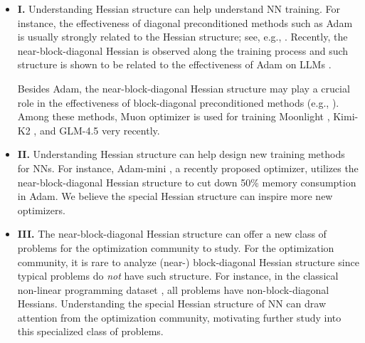 \documentclass{article}
\newcommand{\1}{^{(1)}}
\newcommand{\2}{^{(2)}}
\begin{document}
\begin{itemize}
[topsep=1pt,parsep=1pt,partopsep=1pt, leftmargin=*]
    \item {\bf I.} Understanding Hessian structure can help understand NN training. For instance, the effectiveness of diagonal preconditioned methods such as Adam \citep{kingma2014adam} is usually strongly related to the Hessian structure; see, e.g.,  \citet{sun2021worst,qu2022optimal,das2024towards}. Recently, the near-block-diagonal Hessian is observed along the training process and such structure is shown to 
 be related to the effectiveness of Adam on LLMs \citep{zhang2024transformers,kunstner2024heavy}. 
 
 Besides Adam, the near-block-diagonal Hessian structure may play a crucial role in the effectiveness of block-diagonal preconditioned methods (e.g.,  \citep{martens2015optimizing,gupta2018shampoo,goldfarb2020practical,vyas2024soap,jordan2024muon}). Among these methods,   Muon optimizer \citep{jordan2024muon} is used for training Moonlight \citep{liu2025muon}, Kimi-K2 \citep{moonshot2025k2}, and  GLM-4.5 \citep{zeng2025glm}  very recently. 
    
    \item {\bf II.} Understanding Hessian structure can help design new training methods for NNs. For instance, Adam-mini \citep{zhang2024adam}, a recently proposed optimizer,  utilizes the near-block-diagonal Hessian structure to cut down 50\% memory consumption in Adam. We believe the special Hessian structure can inspire more new optimizers. 
 
   
\item {\bf III. } 
The near-block-diagonal Hessian structure can offer a new class of problems for the optimization community
to study. 
For the optimization community, it is rare to analyze (near-) block-diagonal Hessian structure since typical problems do {\it not} have such structure. For instance, in the classical non-linear programming dataset \citep{lavezzi2022nonlinear}, all problems have non-block-diagonal Hessians. 
Understanding the special Hessian structure of NN can draw attention from the optimization community, motivating further study into this specialized class of problems. 
\end{itemize}
\end{document}

